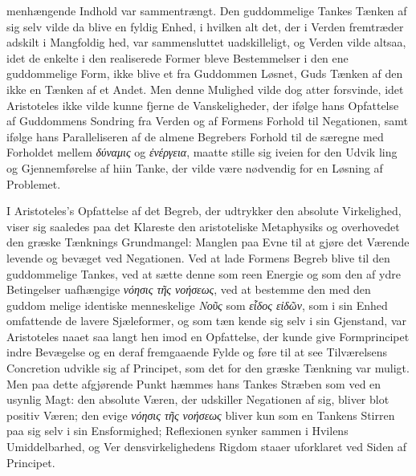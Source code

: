 \documentclass[12pt,a4paper]{book}
\newcommand{\gk}[1]{\textit{#1}}
\begin{document}
menhængende Indhold var sammentrængt. Den guddommelige
Tankes Tænken af sig selv vilde da blive en fyldig Enhed, i
hvilken alt det, der i Verden fremtræder adskilt i Mangfoldig\-%
hed, var sammensluttet uadskilleligt, og Verden vilde altsaa,
idet de enkelte i den realiserede Former bleve Bestemmelser
i den ene guddommelige Form, ikke blive et fra Guddommen
Løsnet, Guds Tænken af den ikke en Tænken af et Andet.
Men denne Mulighed vilde dog atter forsvinde, idet Aristoteles
ikke vilde kunne fjerne de Vanskeligheder, der ifølge hans
Opfattelse af Guddommens Sondring fra Verden og af Formens
Forhold til Negationen, samt ifølge hans Paralleliseren af de
almene Begrebers Forhold til de særegne med Forholdet mellem
\gk{δύναμις} og \gk{ἐνέργεια}, maatte stille sig iveien for den Udvik\-%
ling og Gjennemførelse af hiin Tanke, der vilde være nødvendig
for en Løsning af Problemet.

I Aristoteles's Opfattelse af det Begreb, der udtrykker den
absolute Virkelighed, viser sig saaledes paa det Klareste den
aristoteliske Metaphysiks og overhovedet den græske Tænknings
Grundmangel: Manglen paa Evne til at gjøre det Værende
levende og bevæget ved Negationen. Ved at lade Formens
Begreb blive til den guddommelige Tankes, ved at sætte denne
som reen Energie og som den af ydre Betingelser uafhængige
\gk{νόησις τῆς νοήσεως}, ved at bestemme den med den guddom\-%
melige identiske menneskelige \gk{Νοῦς} som \gk{εἶδος εἰδῶν}, som i
sin Enhed omfattende de lavere Sjæleformer, og som tæn\-%
kende sig selv i sin Gjenstand, var Aristoteles naaet saa langt
hen imod en Opfattelse, der kunde give Formprincipet indre
Bevægelse og en deraf fremgaaende Fylde og føre til at see
Tilværelsens Concretion udvikle sig af Principet, som det for
den græske Tænkning var muligt. Men paa dette afgjørende
Punkt hæmmes hans Tankes Stræben som ved en usynlig
Magt: den absolute Væren, der udskiller Negationen af sig,
bliver blot positiv Væren; den evige \gk{νόησις τῆς νοήσεως} bliver
kun som en Tankens Stirren paa sig selv i sin Ensformighed;
Reflexionen synker sammen i Hvilens Umiddelbarhed, og Ver\-%
densvirkelighedens Rigdom staaer uforklaret ved Siden af
Principet.
\end{document}
